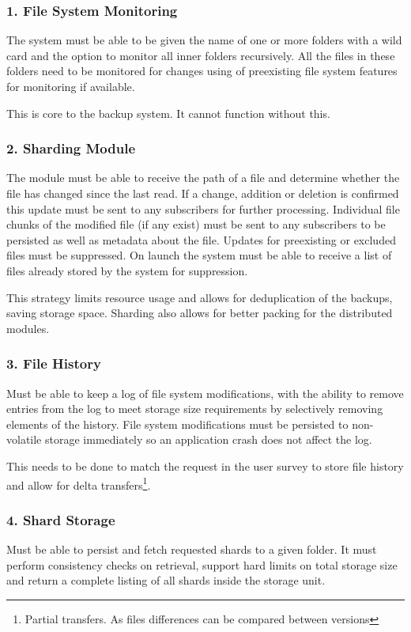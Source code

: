 \documentclass[11pt, a4paper, twoside]{report}
\begin{document}
\subsubsection{1. File System Monitoring}
The system must be able to be given the name of one or more folders with a wild card and the option to monitor all inner folders recursively. All the files in these folders need to be monitored for changes using of preexisting file system features for monitoring if available.

This is core to the backup system. It cannot function without this.

\subsubsection{2. Sharding Module}
The module must be able to receive the path of a file and determine whether the file has changed since the last read. If a change, addition or deletion is confirmed this update must be sent to any subscribers for further processing. Individual file chunks of the modified file (if any exist) must be sent to any subscribers to be persisted as well as metadata about the file. Updates for preexisting or excluded files must be suppressed. On launch the system must be able to receive a list of files already stored by the system for suppression.

This strategy limits resource usage and allows for deduplication of the backups, saving storage space. Sharding also allows for better packing for the distributed modules.

\subsubsection{3. File History}
Must be able to keep a log of file system modifications, with the ability to remove entries from the log to meet storage size requirements by selectively removing elements of the history. File system modifications must be persisted to non-volatile storage immediately so an application crash does not affect the log.

This needs to be done to match the request in the user survey to store file history and allow for delta transfers\footnote{Partial transfers. As files differences can be compared between versions}.

\subsubsection{4. Shard Storage}
Must be able to persist and fetch requested shards to a given folder. It must perform consistency checks on retrieval, support hard limits on total storage size and return a complete listing of all shards inside the storage unit.
\end{document}
